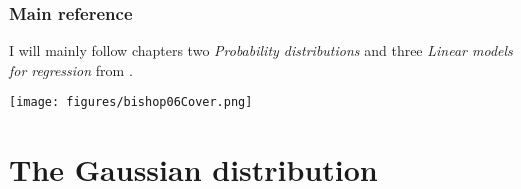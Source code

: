 \begin{frame}
\frametitle{Main reference} %

    I will mainly follow chapters two \textit{Probability distributions} and
    three \textit{Linear models for regression} from
    \citet{bishop06}.

    \begin{center}
        \texttt{[image: figures/bishop06Cover.png]}
    \end{center}

\end{frame}

\begin{comment}
\begin{frame}
\frametitle{Main lecture goals}

    \begin{figure}
        \begin{tikzpicture}
            \node[ellipse,align=center,anchor=north,fill=blue!20,draw=blue] (foundations) {Mathematical\\foundations\\of probability};
            \node[ellipse,align=center,anchor=north,fill=orange!20,draw=orange] [below left=of foundations] (proofs) {Proofs\\(beautiful)};
            \node[ellipse,align=center,anchor=north,fill=orange!20,draw=orange] [below=of foundations] (examples) {Examples\\(fun)};
            \node[ellipse,align=center,anchor=north,fill=orange!20,draw=orange] [below right=of foundations] (simulations) {Simulations\\(useful)};
            \path[-] (foundations) edge node [] {} (proofs);
            \path[-] (foundations) edge node [] {} (examples);
            \path[-] (foundations) edge node [] {} (simulations);
        \end{tikzpicture}
    \end{figure }

\end{frame}
\end{comment}

\section{The Gaussian distribution}

